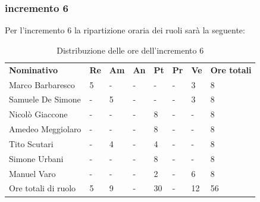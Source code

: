 \subsubsection{incremento 6}
Per l'incremento 6 la ripartizione oraria dei ruoli sarà la seguente:
\begin{center}
    \begin{table}[ht!]
        \centering
        \caption{Distribuzione delle ore dell'incremento 6}
        \vspace{5px}
        \renewcommand{\arraystretch}{1.8}
        \begin{tabular}{p{100px} p{20px} p{20px} p{20px} p{20px} p{20px} p{20px} p{50px} }
            \rowcolor{logo!70} \textbf{Nominativo} & \textbf{Re} & \textbf{Am} & \textbf{An} & \textbf{Pt} & \textbf{Pr} & \textbf{Ve} & \textbf{Ore totali} \\
            Marco Barbaresco                       & 5           & -           & -           & -           & -           & 3           & 8                   \\
            Samuele De Simone                      & -           & 5           & -           & -           & -           & 3           & 8                   \\
            Nicolò Giaccone                        & -           & -           & -           & 8           & -           & -           & 8                   \\
            Amedeo Meggiolaro                      & -           & -           & -           & 8           & -           & -           & 8                   \\
            Tito Scutari                           & -           & 4           & -           & 4           & -           & -           & 8                   \\
            Simone Urbani                          & -           & -           & -           & 8           & -           & -           & 8                   \\
            Manuel Varo                            & -           & -           & -           & 2           & -           & 6           & 8                   \\
            Ore totali di ruolo                    & 5           & 9           & -           & 30          & -           & 12          & 56                  \\
        \end{tabular}
    \end{table}
\end{center}

